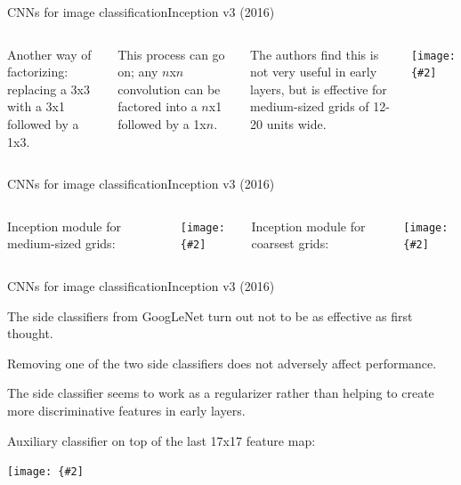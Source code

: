 \documentclass[aspectratio=169]{beamer}
\newcommand{\myfig}[3]{\centerline{\texttt{[image: \{\#2]}}}
\begin{document}
\begin{frame}{CNNs for image classification}{Inception v3 (2016)}

  \begin{columns}

  \column{3in}
  
  Another way of factorizing:
  replacing a 3x3 with a 3x1 followed by a 1x3.

  \medskip

  This process can go on; any $n$x$n$ convolution can be
  factored into a $n$x1 followed by a 1x$n$.

  \medskip

  The authors find this is not very useful in early 
  layers, but is effective for medium-sized grids of 12-20
  units wide.

  \column{1.5in}

  \myfig{1.4in}{szegedy-15-fig3}{Szegedy et al. (2016), Figure 3}

  \end{columns}

\end{frame}


\begin{frame}{CNNs for image classification}{Inception v3 (2016)}

  \begin{columns}

  \column{2in}

  Inception module for medium-sized grids:

  \medskip

  \myfig{1.6in}{szegedy-15-fig6}{Szegedy et al. (2016), Figure 6}

  \column{2in}

  Inception module for coarsest grids:
	  
  \medskip

  \myfig{1.8in}{szegedy-15-fig7}{Szegedy et al. (2016), Figure 7}

  \end{columns}

\end{frame}


\begin{frame}{CNNs for image classification}{Inception v3 (2016)}

  The side classifiers from GoogLeNet turn out not to be as effective
  as first thought.

  \medskip

  Removing one of the two side classifiers does not adversely affect
  performance.

  \medskip

  The side classifier seems to work as a regularizer rather than
  helping to create more discriminative features in early layers.

  \medskip

  Auxiliary classifier on top of the last 17x17 feature map:

  \medskip

  \myfig{2in}{szegedy-15-fig8}{Szegedy et al. (2016), Figure 8}

\end{frame}
\end{document}

